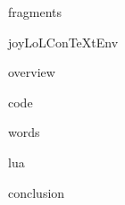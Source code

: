 
\usemodule[t-diSimp]

\startDiSimpComponent fragments

\diSimpEnvironment joyLoLConTeXtEnv

\startJoyLoLCoAlg[title=Code fragments][fragments]

\diSimpComponent overview

\diSimpComponent code

\diSimpComponent words

\diSimpComponent lua

\diSimpComponent conclusion

\stopJoyLoLCoAlg

\stopDiSimpComponent
